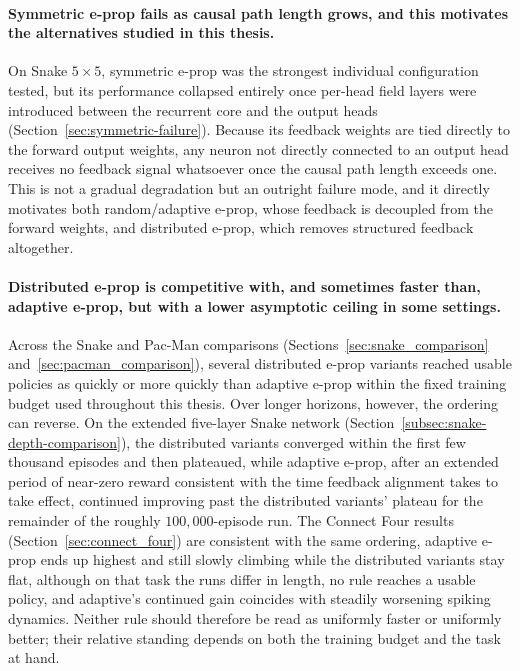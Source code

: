 \paragraph{Symmetric e-prop fails as causal path length grows, and this
motivates the alternatives studied in this thesis.} On Snake $5\times5$,
symmetric e-prop was the strongest individual configuration tested, but
its performance collapsed entirely once per-head field layers were
introduced between the recurrent core and the output heads
(Section~\ref{sec:symmetric-failure}). Because its feedback weights are
tied directly to the forward output weights, any neuron not directly
connected to an output head receives no feedback signal whatsoever once
the causal path length exceeds one. This is not a gradual degradation but
an outright failure mode, and it directly motivates both random/adaptive
e-prop, whose feedback is decoupled from the forward weights, and
distributed e-prop, which removes structured feedback altogether.

\paragraph{Distributed e-prop is competitive with, and sometimes faster than, adaptive e-prop, but with
a lower asymptotic ceiling in some settings.} Across the Snake and Pac-Man comparisons
(Sections~\ref{sec:snake_comparison} and~\ref{sec:pacman_comparison}),
several distributed e-prop variants reached usable policies as quickly or more quickly than adaptive
e-prop within the fixed training budget used throughout this thesis. Over longer horizons, however,
the ordering can reverse. On the extended five-layer Snake network (Section~\ref{subsec:snake-depth-comparison}),
the distributed variants converged within the first few thousand episodes and then plateaued, while
adaptive e-prop, after an extended period of near-zero reward consistent with the time feedback
alignment takes to take effect, continued improving past the distributed variants' plateau for the
remainder of the roughly $100{,}000$-episode run. The Connect Four results
(Section~\ref{sec:connect_four}) are consistent with the same ordering, adaptive e-prop ends up
highest and still slowly climbing while the distributed variants stay flat, although on that task the
runs differ in length, no rule reaches a usable policy, and adaptive's continued gain coincides with
steadily worsening spiking dynamics. Neither rule
should therefore be read as uniformly faster or uniformly better; their relative standing depends on
both the training budget and the task at hand.

